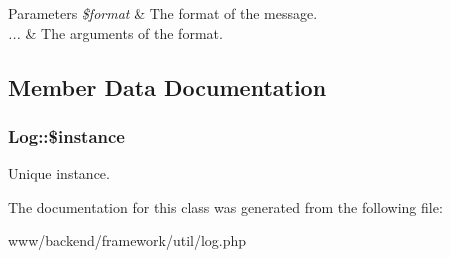 \begin{DoxyParams}{Parameters}
{\em \$format} & The format of the message. \\
\hline
{\em ...} & The arguments of the format. \\
\hline
\end{DoxyParams}


\subsection{Member Data Documentation}
\hypertarget{classLog_af469fce19eb78a62dce34d2925348d53}{
\subsubsection[{\$instance}]{\setlength{\rightskip}{0pt plus 5cm}Log::\$instance}}
\label{classLog_af469fce19eb78a62dce34d2925348d53}
Unique instance. 

The documentation for this class was generated from the following file:\begin{DoxyCompactItemize}
\item 
www/backend/framework/util/log.php\end{DoxyCompactItemize}
